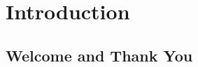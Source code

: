 


\pagestyle{fancy} %


\chapter{Introduction} %

\label{chap:ntroduction} %



\section{Welcome and Thank You}

\citep{Reference3}